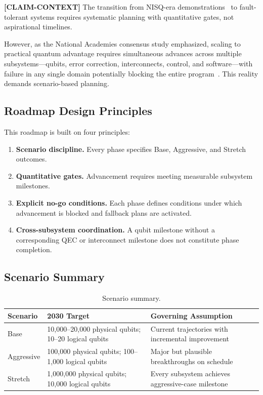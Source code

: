 \documentclass[conference]{IEEEtran}
\begin{document}
\textbf{[CLAIM-CONTEXT]} The transition from NISQ-era demonstrations~\cite{preskill2018} to fault-tolerant systems requires systematic planning with quantitative gates, not aspirational timelines.

However, as the National Academies consensus study emphasized, scaling to practical quantum advantage requires simultaneous advances across multiple subsystems---qubits, error correction, interconnects, control, and software---with failure in any single domain potentially blocking the entire program~\cite{nasem2019}. This reality demands scenario-based planning.

\subsection{Roadmap Design Principles}

This roadmap is built on four principles:

\begin{enumerate}[leftmargin=*]
\item \textbf{Scenario discipline.} Every phase specifies Base, Aggressive, and Stretch outcomes.
\item \textbf{Quantitative gates.} Advancement requires meeting measurable subsystem milestones.
\item \textbf{Explicit no-go conditions.} Each phase defines conditions under which advancement is blocked and fallback plans are activated.
\item \textbf{Cross-subsystem coordination.} A qubit milestone without a corresponding QEC or interconnect milestone does not constitute phase completion.
\end{enumerate}

\subsection{Scenario Summary}

\begin{table}[H]
\centering
\caption{Scenario summary.}
\label{tab:scenario_summary}
\begin{tabular}{@{}l L{4cm} L{3cm}@{}}
\toprule
\textbf{Scenario} & \textbf{2030 Target} & \textbf{Governing Assumption} \\
\midrule
Base & 10,000--20,000 physical qubits; 10--20 logical qubits & Current trajectories with incremental improvement \\
Aggressive & 100,000 physical qubits; 100--1,000 logical qubits & Major but plausible breakthroughs on schedule \\
Stretch & 1,000,000 physical qubits; 10,000 logical qubits & Every subsystem achieves aggressive-case milestone \\
\bottomrule
\end{tabular}
\end{table}
\end{document}
